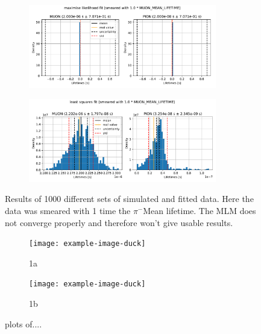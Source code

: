 \documentclass[11pt, a4paper, oneside]{book}
\newcommand\DoublePlotwidth{0.9}
\newcommand{\pion}{$\pi^{-}$}
\begin{document}
\begin{figure}[h]
\begin{subfigure}{\textwidth}
  \centering
  \includegraphics[width=\DoublePlotwidth\textwidth]{images/4b_hist_2_likelihood.pdf}
\end{subfigure}

\begin{subfigure}{\textwidth}
  \centering
  \includegraphics[width=\DoublePlotwidth\textwidth]{images/4b_hist_2_squares.pdf}
\end{subfigure}
\caption{Results of 1000 different sets of simulated and fitted data. Here the data was smeared with 1 time the \pion Mean lifetime. The MLM does not converge properly and therefore won't give usable results.}
\label{fig:results_smeared_2}
\end{figure}

\begin{figure}[h]
\begin{subfigure}{\textwidth}
  \centering
  \texttt{[image: example-image-duck]}
  \caption{1a}
\end{subfigure}

\begin{subfigure}{\textwidth}
  \centering
  \texttt{[image: example-image-duck]}
  \caption{1b}
\end{subfigure}
\caption{plots of....}
\label{fig:fig}
\end{figure}
\end{document}

